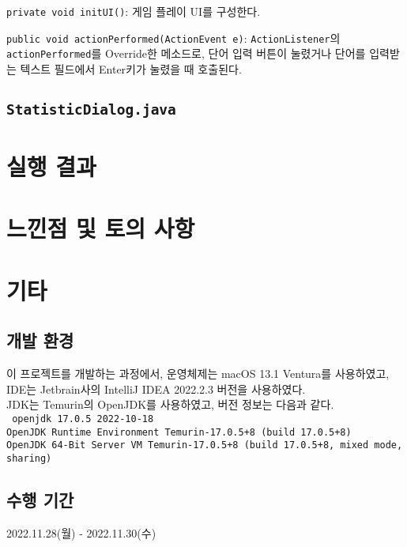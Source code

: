 \texttt{private void initUI()}:
게임 플레이 UI를 구성한다.

\texttt{public void actionPerformed(ActionEvent e)}:
\texttt{ActionListener}의 \texttt{actionPerformed}를 Override한 메소드로,
단어 입력 버튼이 눌렸거나 단어를 입력받는 텍스트 필드에서 Enter키가 눌렸을 때 호출된다.



\subsection{\texttt{StatisticDialog.java}}


\section{실행 결과}
\section{느낀점 및 토의 사항}
\section{기타}
\subsection{개발 환경}
이 프로젝트를 개발하는 과정에서, 운영체제는 macOS 13.1 Ventura를 사용하였고, IDE는 Jetbrain사의 IntelliJ IDEA 2022.2.3 버전을 사용하였다.\\
JDK는 Temurin의 OpenJDK를 사용하였고, 버전 정보는 다음과 같다.\\
\texttt{
    openjdk 17.0.5 2022-10-18\\
    OpenJDK Runtime Environment Temurin-17.0.5+8 (build 17.0.5+8)\\
    OpenJDK 64-Bit Server VM Temurin-17.0.5+8 (build 17.0.5+8, mixed mode, sharing)
}

\subsection{수행 기간}
2022.11.28(월) - 2022.11.30(수)

